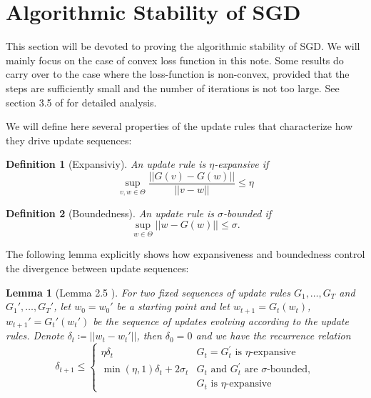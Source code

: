 \documentclass{article}[12pt]
\newtheorem{lemma}{Lemma}
\newtheorem{defn}{Definition}
\newcommand{\norm}[1]{\left|\left|#1\right|\right|}
\begin{document}
\section{Algorithmic Stability of SGD} \label{sec4}
This section will be devoted to proving the algorithmic stability of SGD. We will mainly focus on the case of convex loss function in this note. Some results do carry over to the case where the loss-function is non-convex, provided that the steps are sufficiently small and the number of iterations is not too large. See section 3.5 of \cite{trainfaster} for detailed analysis. 

We will define here several properties of the update rules that characterize how they drive update sequences:
\begin{defn}[Expansiviy] 
   An update rule is $\eta$-expansive if 
   \[
   \sup_{v, w \in \Theta} \frac{\norm{G(v) - G(w)}}{\norm{v - w}}  \leq \eta
   \]
\end{defn}
\begin{defn}[Boundedness]
   An update rule is $\sigma$-bounded if 
   \[
   \sup_{w \in \Theta} \norm{w - G(w)}  \leq \sigma.
   \]   
\end{defn}
The following lemma explicitly shows how expansiveness and boundedness control the divergence between update sequences:
\begin{lemma} [Lemma 2.5 \cite{trainfaster}] \label{growth}
  For two fixed sequences of update rules $G_1, \ldots, G_T$ and $G_1', \ldots, G_T'$, let $w_0 = w_0'$ be a starting point and let $w_{t+1} = G_t(w_t)$, $w_{t+1}' = G_t'(w_t')$ be the sequence of updates evolving according to the update rules. Denote $\delta_t \coloneqq \norm{w_t - w_t'}$, then $\delta_0 = 0$ and we have the recurrence relation 
  \[
\delta_{t+1} \leq\left\{\begin{array}{cl}{\eta \delta_{t}} & {G_{t}=G_{t}^{\prime} \text { is } \eta \text {-expansive }} \\ {\min (\eta, 1) \delta_{t}+2 \sigma_{t}} & {G_{t} \text { and } G_{t}^{\prime} \text { are } \sigma \text {-bounded},} \\ {} & {G_{t} \text { is } \eta \text {-expansive}}\end{array}\right.   
  \]
\end{lemma}
\end{document}
